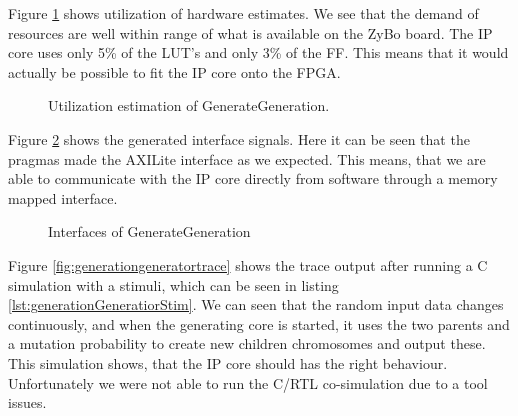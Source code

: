 Figure \ref{fig:ggutilizationestimates} shows utilization of hardware estimates. We see that the demand of resources are well within range of what is available on the ZyBo board. The IP core uses only 5\% of the LUT's and only 3\% of the FF. This means that it would actually be possible to fit the IP core onto the FPGA.
\FloatBarrier

\begin{figure}[h!]
	\centering
	\caption{Utilization estimation of GenerateGeneration.}
	\label{fig:ggutilizationestimates}
\end{figure}
\FloatBarrier

Figure \ref{fig:gginterface} shows the generated interface signals. Here it can be seen that the pragmas made the AXILite interface as we expected. This means, that we are able to communicate with the IP core directly from software through a memory mapped interface.

\begin{figure}[h!]
	\centering
	\caption{Interfaces of GenerateGeneration}
	\label{fig:gginterface}
\end{figure}

Figure \ref{fig:generationgeneratortrace} shows the trace output after running a C simulation with a stimuli, which can be seen in listing \ref{lst:generationGeneratiorStim}. We can seen that the random input data changes continuously, and when the generating core is started, it uses the two parents and a mutation probability to create new children chromosomes and output these. This simulation shows, that the IP core should has the right behaviour. Unfortunately we were not able to run the C/RTL co-simulation  due to a tool issues.

